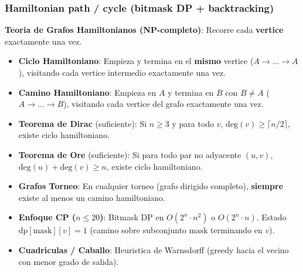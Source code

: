\subsubsection{Hamiltonian path / cycle (bitmask DP + backtracking)}

\textbf{Teoria de Grafos Hamiltonianos (NP-completo)}:
Recorre cada \textbf{vertice} exactamente una vez.
\begin{itemize}\setlength\itemsep{0pt}
	\item \textbf{Ciclo Hamiltoniano}: Empieza y termina en el \textbf{mismo} vertice ($A \to \dots \to A$), visitando cada vertice intermedio exactamente una vez.
	\item \textbf{Camino Hamiltoniano}: Empieza en $A$ y termina en $B$ con $B \ne A$ ($A \to \dots \to B$), visitando cada vertice del grafo exactamente una vez.
	\item \textbf{Teorema de Dirac} (suficiente): Si $n \ge 3$ y para todo $v$, $\text{deg}(v) \ge \lceil n/2 \rceil$, existe ciclo hamiltoniano.
	\item \textbf{Teorema de Ore} (suficiente): Si para todo par no adyacente $(u, v)$, $\text{deg}(u) + \text{deg}(v) \ge n$, existe ciclo hamiltoniano.
	\item \textbf{Grafos Torneo}: En cualquier torneo (grafo dirigido completo), \textbf{siempre} existe al menos un camino hamiltoniano.
	\item \textbf{Enfoque CP ($n \le 20$)}: Bitmask DP en $O(2^n \cdot n^2)$ o $O(2^n \cdot n)$. Estado $\text{dp}[\text{mask}][v] = 1$ (camino sobre subconjunto $\text{mask}$ terminando en $v$).
	\item \textbf{Cuadriculas / Caballo}: Heuristica de Warnsdorff (greedy hacia el vecino con menor grado de salida).
\end{itemize}

